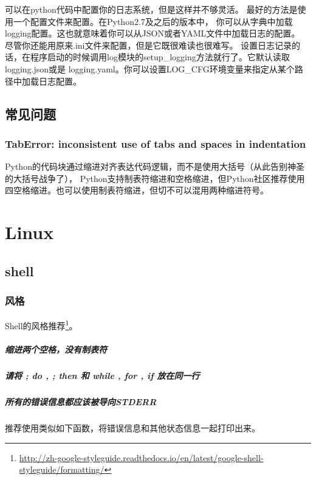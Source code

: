 \documentclass{book}
\begin{document}
可以在python代码中配置你的日志系统，但是这样并不够灵活。
最好的方法是使用一个配置文件来配置。在Python2.7及之后的版本中，
你可以从字典中加载logging配置。这也就意味着你可以从JSON或者YAML文件中加载日志的配置。
尽管你还能用原来.ini文件来配置，但是它既很难读也很难写。
设置日志记录的话，在程序启动的时候调用log模块的setup\_logging方法就行了。它默认读取logging.json或是 logging.yaml。你可以设置LOG\_CFG环境变量来指定从某个路径中加载日志配置。

\section{常见问题}

\subsection{TabError: inconsistent use of tabs and spaces in indentation}

Python的代码块通过缩进对齐表达代码逻辑，而不是使用大括号（从此告别神圣的大括号战争了），
Python支持制表符缩进和空格缩进，但Python社区推荐使用四空格缩进。也可以使用制表符缩进，但切不可以混用两种缩进符号。

\chapter{Linux}

\section{shell}

\subsection{风格}

Shell的风格推荐\footnote{\url{http://zh-google-styleguide.readthedocs.io/en/latest/google-shell-styleguide/formatting/}}。


\paragraph{缩进两个空格，没有制表符}
\paragraph{请将 ; do , ; then 和 while , for , if 放在同一行}
\paragraph{所有的错误信息都应该被导向STDERR}
推荐使用类似如下函数，将错误信息和其他状态信息一起打印出来。
\end{document}
